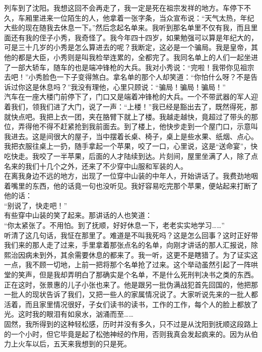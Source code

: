 列车到了沈阳。我想这回不会再走了，我一定是死在祖宗发祥的地方。车停下不久，车厢里进来一位陌生的人，他拿着一张字条，当众宣布说：“天气太热，年纪大些的现在随我去休息一下。”然后念起名单来。我听到那名单里不仅有我，而且里面还有我的侄子小秀，我奇怪了。我今年四十四岁，如果勉强可以算是年纪大的，可是三十几岁的小秀是怎么算进去的呢？我断定，这必是一个骗局。我是皇帝，其他的都是大臣，小秀则是叫我检举连累的，全都完了。我同名单上的人们一起坐进了一部大轿车，随车的也是端冲锋枪的大兵。我对小秀说：“完啦！我带你见祖宗去吧！”小秀脸色一下子变得煞白。拿名单的那个人却笑道：“你怕什么呀？不是告诉过你这是休息吗？”我没有理他，心里只顾说：“骗局！骗局！骗局！”\\

汽车在一座大楼门前停下了，门口又是端着冲锋枪的大兵。一个不带武器的军人迎着我们，领我们进了大门，说了一声：“上楼！”我已经是豁出去了，既然得死，那就快点吧。我把上衣一团，夹在胳臂下就上了楼。我越走越快，竟超过了带头的那位，弄得他不得不赶紧抢到我前面去。到了楼上，他快步走到一个屋门口，示意叫我进去。这是间很大的屋子，当中摆着长桌、椅子，桌上是些水果、纸烟、点心。我把衣服往桌上一扔，随手拿起一个苹果，咬了一口，心里说，这是“送命宴”，快吃快走。我咬了一半苹果，后面的人才陆续到达。片刻间，屋里坐满了人，除了点名来的我们十几个之外，还来了不少穿中山服和军装的人。\\

在离我身边不远的地方，出现了一位穿中山装的中年人，开始讲话了。我费劲地咽着嘴里的东西，他的话竟一句也没听见。我好容易吃完那个苹果，便站起来打断了他的话：\\

“别说了，快走吧！”\\

有些穿中山装的笑了起来。那讲话的人也笑道：\\

“你太紧张了。不用怕。到了抚顺，好好休息一下，老老实实地学习……”\\

听清了这几句话，我怔在那里了。难道是不叫我死吗？这是怎么回事？这时正好带我们来的那人走了过来，手里拿着那张点名的名单，向刚才讲话的那人汇报说，除熙治因病未到外，其余需要休息的都来了。我一听，这更不是瞎猎了。为了证实这一点，我不顾一切地，上前一把将那个名单抢了过来。这个举动虽然引起了一阵哄堂的笑声，但是我却弄明白了那确实是个名单，不是什么死刑判决书之类的东西。正在这时，张景惠的儿子小张也来了。他是跟另一批伪满战犯首先回国的，他把那一批人的现状告诉了我们，又把一些人的家属情况说了。大家听说先来的一批人都活着，而且家里情况很好，子女们读书的读书，工作的工作，每个人的脸上都放了光。这时我的眼泪有如泉水，汹涌而至……\\

固然，我所得到的这种轻松感，历时并没有多久，只不过是从沈阳到抚顺这段路上的一个小时，但它毕竟是起了松弛神经的作用，否则我真会发起疯来的。因为从伯力上火车以后，五天来我想到的只是死。